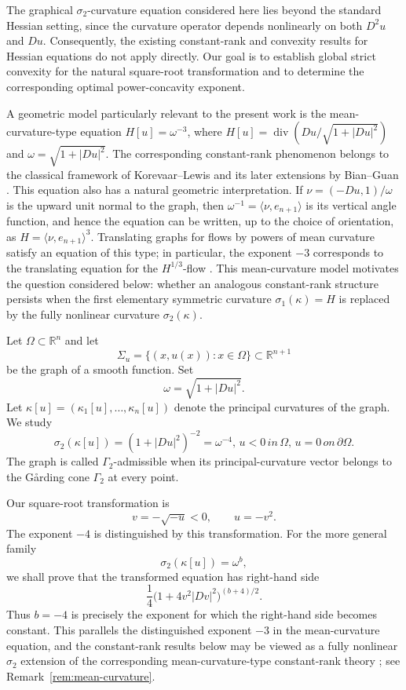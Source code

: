 \documentclass{article}
\newcommand{\R}{\mathbb R}
\numberwithin{equation}{section}
\begin{document}
The graphical $\sigma_2$-curvature equation considered here lies beyond the standard Hessian setting, since the curvature operator depends nonlinearly on both $D^2u$ and $Du$. Consequently, the existing constant-rank and convexity results for Hessian equations do not apply directly. Our goal is to establish global strict convexity for the natural square-root transformation and to determine the corresponding optimal power-concavity exponent.

A geometric model particularly relevant to the present work is the
mean-curvature-type equation
$H[u]=\omega^{-3}$, where
$H[u]=\operatorname{div}(Du/\sqrt{1+|Du|^2})$ and
$\omega=\sqrt{1+|Du|^2}$. The corresponding constant-rank phenomenon belongs
to the classical framework of Korevaar--Lewis and its later extensions by
Bian--Guan \cite{KL87,BG09,BG10}. This equation also has a natural geometric
interpretation. If
$\nu=(-Du,1)/\omega$ is the upward unit normal to the graph, then
$\omega^{-1}=\langle\nu,e_{n+1}\rangle$ is its vertical angle function, and
hence the equation can be written, up to the choice of orientation, as
$H=\langle\nu,e_{n+1}\rangle^3$. Translating graphs for flows by powers of
mean curvature satisfy an equation of this type; in particular, the exponent
$-3$ corresponds to the translating equation for the $H^{1/3}$-flow
\cite{JJ11}. This mean-curvature model motivates the question considered
below: whether an analogous constant-rank structure persists when the first
elementary symmetric curvature $\sigma_1(\kappa)=H$ is replaced by the
fully nonlinear curvature $\sigma_2(\kappa)$.

Let $\Omega\subset\R^n$ and let
\[
\Sigma_u=\{(x,u(x)):x\in\Omega\}\subset\R^{n+1}
\]
be the graph of a smooth function. Set
\[
\omega=\sqrt{1+|Du|^2}.
\]
Let $\kappa[u]=(\kappa_1[u],\ldots,\kappa_n[u])$ denote the principal curvatures of the graph. We study
\begin{equation}\label{eq:real-main}
\sigma_2(\kappa[u])=(1+|Du|^2)^{-2}=\omega^{-4},\,u<0 \,in\,\Omega,
\, u=0 \, on\,\partial\Omega.
\end{equation}
The graph is called $\Gamma_2$-admissible when its principal-curvature vector belongs to the G\aa rding cone $\Gamma_2$ at every point.

Our square-root transformation is
\begin{equation}\label{eq:transform-intro}
v=-\sqrt{-u}<0,\qquad u=-v^2.
\end{equation}
The exponent $-4$ is distinguished by this transformation. For the more general family
\[
\sigma_2(\kappa[u])=\omega^b,
\]
we shall prove that the transformed equation has right-hand side
\[
\frac14\bigl(1+4v^2|Dv|^2\bigr)^{(b+4)/2}.
\]
Thus $b=-4$ is precisely the exponent for which the right-hand side becomes constant. This parallels the distinguished exponent $-3$ in the mean-curvature equation, and the constant-rank results below may be viewed as a fully nonlinear $\sigma_2$ extension of the corresponding mean-curvature-type constant-rank theory \cite{KL87,BG09,BG10}; see Remark~\ref{rem:mean-curvature}.
\end{document}
